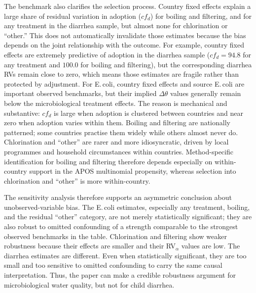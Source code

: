 \documentclass [11pt]{article}
\theoremstyle{plain}
\theoremstyle{definition}
\theoremstyle{remark}
\newcommand{\1}{\bm{1}}
\begin{document}
The benchmark also clarifies the selection process. Country fixed effects explain a large share of residual variation in adoption ($cf_d$) for boiling and filtering, and for any treatment in the diarrhea sample, but almost none for chlorination or ``other.'' This does not automatically invalidate those estimates because the bias depends on the joint relationship with the outcome. For example, country fixed effects are extremely predictive of adoption in the diarrhea sample ($cf_d=94.8$ for any treatment and $100.0$ for boiling and filtering), but the corresponding diarrhea RVs remain close to zero, which means those estimates are fragile rather than protected by adjustment. For E.\,coli, country fixed effects and source E.\,coli are important observed benchmarks, but their implied $\Delta\theta$ values generally remain below the microbiological treatment effects. The reason is mechanical and substantive: $cf_d$ is large when adoption is clustered between countries and near zero when adoption varies within them. Boiling and filtering are nationally patterned; some countries practise them widely while others almost never do. Chlorination and ``other'' are rarer and more idiosyncratic, driven by local programmes and household circumstances within countries. Method-specific identification for boiling and filtering therefore depends especially on within-country support in the APOS multinomial propensity, whereas selection into chlorination and ``other'' is more within-country.

The sensitivity analysis therefore supports an asymmetric conclusion about unobserved-variable bias. The E.\,coli estimates, especially any treatment, boiling, and the residual ``other'' category, are not merely statistically significant; they are also robust to omitted confounding of a strength comparable to the strongest observed benchmarks in the table. Chlorination and filtering show weaker robustness because their effects are smaller and their RV$_\alpha$ values are low. The diarrhea estimates are different. Even when statistically significant, they are too small and too sensitive to omitted confounding to carry the same causal interpretation. Thus, the paper can make a credible robustness argument for microbiological water quality, but not for child diarrhea.
\end{document}
